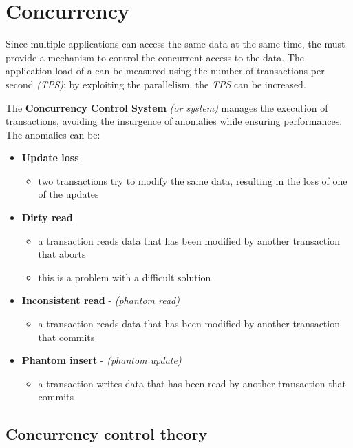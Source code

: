 \documentclass[english]{article}
\begin{document}
\section{Concurrency}

Since multiple applications can access the same data at the same time, the \dbms must provide a mechanism to control the concurrent access to the data.
The application load of a \dbms can be measured using the number of transactions per second \textit{(TPS)};
by exploiting the parallelism, the \textit{TPS} can be increased.

The \textbf{Concurrency Control System} \textit{(or \cc system)} manages the execution of transactions, avoiding the insurgence of anomalies while ensuring performances.
The anomalies can be:

\begin{itemize}
  \item \textbf{Update loss}
        \begin{itemize}
          \item two transactions try to modify the same data, resulting in the loss of one of the updates
        \end{itemize}
  \item \textbf{Dirty read}
        \begin{itemize}
          \item a transaction reads data that has been modified by another transaction that aborts
          \item this is a problem with a difficult solution
        \end{itemize}
  \item \textbf{Inconsistent read} - \textit{(phantom read)}
        \begin{itemize}
          \item a transaction reads data that has been modified by another transaction that commits
        \end{itemize}
  \item \textbf{Phantom insert} - \textit{(phantom update)}
        \begin{itemize}
          \item a transaction writes data that has been read by another transaction that commits
        \end{itemize}
\end{itemize}

\subsection{Concurrency control theory}
\end{document}
